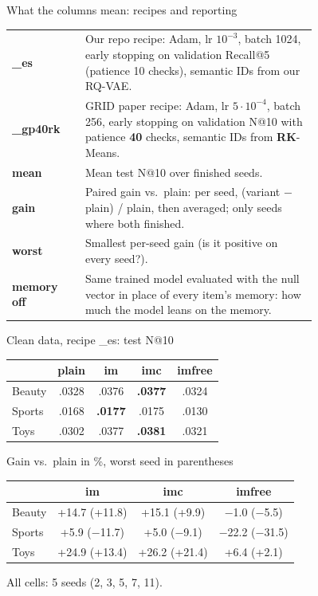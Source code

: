 \documentclass{beamer}
\newcommand{\up}[1]{\textcolor{green!45!black}{#1}}
\newcommand{\dn}[1]{\textcolor{red!70!black}{#1}}
\begin{document}
\begin{frame}{What the columns mean: recipes and reporting}
\small
\begin{tabular}{@{}l p{0.76\linewidth}@{}}
\toprule
\textbf{\_es}     & Our repo recipe: Adam, lr $10^{-3}$, batch 1024, early
                    stopping on validation Recall@5 (patience 10 checks),
                    semantic IDs from our RQ-VAE. \\
\textbf{\_gp40rk} & GRID paper recipe: Adam, lr $5\cdot10^{-4}$, batch 256,
                    early stopping on validation N@10 with patience
                    \textbf{40} checks, semantic IDs from \textbf{RK}-Means. \\
\midrule
\textbf{mean}     & Mean test N@10 over finished seeds. \\
\textbf{gain}     & Paired gain vs.\ plain: per seed, (variant $-$ plain) / plain,
                    then averaged; only seeds where both finished. \\
\textbf{worst}    & Smallest per-seed gain (is it positive on every seed?). \\
\textbf{memory off} & Same trained model evaluated with the null vector in
                    place of every item's memory: how much the model leans
                    on the memory. \\
\bottomrule
\end{tabular}
\end{frame}

\begin{frame}{Clean data, recipe \_es: test N@10}
\centering
\begin{tabular}{lcccc}
\toprule
        & plain & im & imc & imfree \\
\midrule
Beauty  & .0328 & .0376 & \textbf{.0377} & .0324 \\
Sports  & .0168 & \textbf{.0177} & .0175 & .0130 \\
Toys    & .0302 & .0377 & \textbf{.0381} & .0321 \\
\bottomrule
\end{tabular}

\medskip
{\small Gain vs.\ plain in \%, worst seed in parentheses}\par\smallskip
\begin{tabular}{lccc}
\toprule
       & im & imc & imfree \\
\midrule
Beauty & \up{+14.7} (+11.8) & \up{+15.1} (+9.9)  & \dn{$-$1.0} ($-$5.5) \\
Sports & \up{+5.9} (\dn{$-$11.7}) & \up{+5.0} (\dn{$-$9.1}) & \dn{$-$22.2} ($-$31.5) \\
Toys   & \up{+24.9} (+13.4) & \up{+26.2} (+21.4) & \up{+6.4} (+2.1) \\
\bottomrule
\end{tabular}

\bigskip
\footnotesize All cells: 5 seeds (2, 3, 5, 7, 11).
\end{frame}
\end{document}
